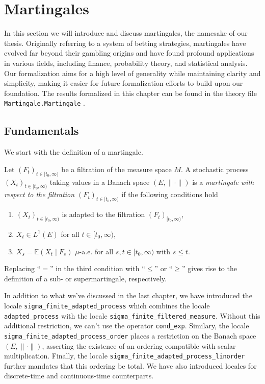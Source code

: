 
\chapter{Martingales}\label{chapter:martingales}

In this section we will introduce and discuss martingales, the namesake of our thesis. Originally referring to a system of betting strategies, martingales have evolved far beyond their gambling origins and have found profound applications in various fields, including finance, probability theory, and statistical analysis. Our formalization aims for a high level of generality while maintaining clarity and simplicity, making it easier for future formalization efforts to build upon our foundation. The results formalized in this chapter can be found in the theory file \texttt{Martingale.Martingale} \cite{Keskin_A_Formalization_of_2023}.

\section{Fundamentals}

We start with the definition of a martingale.

\begin{definition}
	Let $(F_t)_{t \in [t_0,\infty)}$ be a filtration of the measure space $M$. A stochastic process $(X_t)_{t \in [t_0,\infty)}$ taking values in a Banach space $(E, \lVert \cdot \rVert)$ is a \textit{martingale with respect to the filtration $(F_t)_{t \in [t_0,\infty)}$} if the following conditions hold
	\begin{enumerate}
	\item $(X_t)_{t \in [t_0,\infty)}$ is adapted to the filtration $(F_t)_{[t_0,\infty)}$,
	\item $X_t \in L^1(E)$ for all $t \in [t_0, \infty)$,
	\item $X_s = \mathbb{E}(X_t \;\vert\; F_s)$ $\mu$-a.e. for all $s,t \in [t_0,\infty)$ with $s \le t$.
	\end{enumerate}
	Replacing ``$=$'' in the third condition with ``$\le$'' or ``$\ge$'' gives rise to the definition of a sub- or supermartingale, respectively.
\end{definition}

\begin{remark}
 In addition to what we've discussed in the last chapter, we have introduced the locale \texttt{sigma\_finite\_adapted\_process} which combines the locale \texttt{adapted\_process} with the locale \texttt{sigma\_finite\_filtered\_measure}. Without this additional restriction, we can't use the operator \texttt{cond\_exp}. Similary, the locale \texttt{sigma\_finite\_adapted\_process\-\_order} places a restriction on the Banach space $(E, \lVert \cdot \rVert)$, asserting the existence of an ordering compatible with scalar multiplication. Finally, the locale \texttt{sigma\_finite\_adapted\-\_process\_linorder} further mandates that this ordering be total. We have also introduced locales for discrete-time and continuous-time counterparts.
\end{remark}

